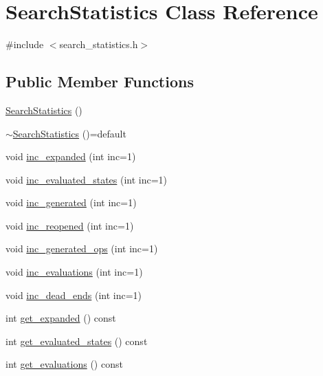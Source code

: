 \hypertarget{classSearchStatistics}{\section{Search\-Statistics Class Reference}
\label{classSearchStatistics}
}


{\ttfamily \#include $<$search\-\_\-statistics.\-h$>$}

\subsection*{Public Member Functions}
\begin{DoxyCompactItemize}
\item 
\hyperlink{classSearchStatistics_a82476f9f96401b9e6723f4f0c483240d}{Search\-Statistics} ()
\item 
\hyperlink{classSearchStatistics_a4cecf70f755c924aece4dfa05f90c558}{$\sim$\-Search\-Statistics} ()=default
\item 
void \hyperlink{classSearchStatistics_a375dc81d063973c7b2adeded062726f9}{inc\-\_\-expanded} (int inc=1)
\item 
void \hyperlink{classSearchStatistics_aca5c210b6a0b0145899c61ef238b9ae1}{inc\-\_\-evaluated\-\_\-states} (int inc=1)
\item 
void \hyperlink{classSearchStatistics_a076f18cb5b7bce47b93b7bfe3ca81bfe}{inc\-\_\-generated} (int inc=1)
\item 
void \hyperlink{classSearchStatistics_a6aec8829af5092c6227c71277b1ea7e8}{inc\-\_\-reopened} (int inc=1)
\item 
void \hyperlink{classSearchStatistics_a2b9ffac593c5e5b03e2c4e92f2e13b42}{inc\-\_\-generated\-\_\-ops} (int inc=1)
\item 
void \hyperlink{classSearchStatistics_a57f71a965c7693054ec18ba1b25a557f}{inc\-\_\-evaluations} (int inc=1)
\item 
void \hyperlink{classSearchStatistics_af23d412b185b33b7f7f0486a7cca853c}{inc\-\_\-dead\-\_\-ends} (int inc=1)
\item 
int \hyperlink{classSearchStatistics_ac81d36b18e9bb132842f5b58df0aa22e}{get\-\_\-expanded} () const 
\item 
int \hyperlink{classSearchStatistics_a43697843768446512031d3a54a002d64}{get\-\_\-evaluated\-\_\-states} () const 
\item 
int \hyperlink{classSearchStatistics_a6d71102c1575a30bdebb58f061f53278}{get\-\_\-evaluations} () const 
\item 

\end{DoxyCompactItemize}
